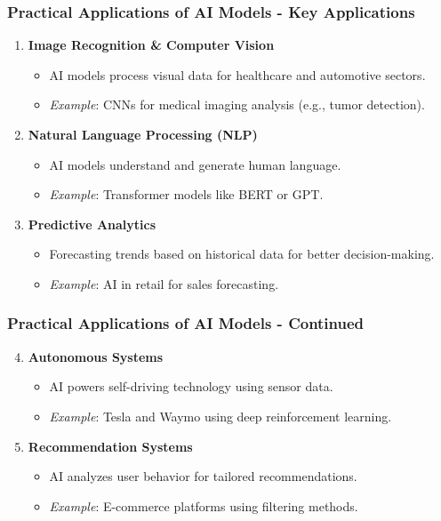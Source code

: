 \documentclass[aspectratio=169]{beamer}
\begin{document}
\begin{frame}[fragile]
    \frametitle{Practical Applications of AI Models - Key Applications}
    \begin{enumerate}
        \item \textbf{Image Recognition \& Computer Vision}
            \begin{itemize}
                \item AI models process visual data for healthcare and automotive sectors.
                \item \textit{Example}: CNNs for medical imaging analysis (e.g., tumor detection).
            \end{itemize}
        
        \item \textbf{Natural Language Processing (NLP)}
            \begin{itemize}
                \item AI models understand and generate human language.
                \item \textit{Example}: Transformer models like BERT or GPT.
            \end{itemize}
        
        \item \textbf{Predictive Analytics}
            \begin{itemize}
                \item Forecasting trends based on historical data for better decision-making.
                \item \textit{Example}: AI in retail for sales forecasting.
            \end{itemize}
    \end{enumerate}
\end{frame}

\begin{frame}[fragile]
    \frametitle{Practical Applications of AI Models - Continued}
    \begin{enumerate}
        \setcounter{enumi}{3}
        \item \textbf{Autonomous Systems}
            \begin{itemize}
                \item AI powers self-driving technology using sensor data.
                \item \textit{Example}: Tesla and Waymo using deep reinforcement learning.
            \end{itemize}
        
        \item \textbf{Recommendation Systems}
            \begin{itemize}
                \item AI analyzes user behavior for tailored recommendations.
                \item \textit{Example}: E-commerce platforms using filtering methods.
            \end{itemize}
    \end{enumerate}
\end{frame}
\end{document}

